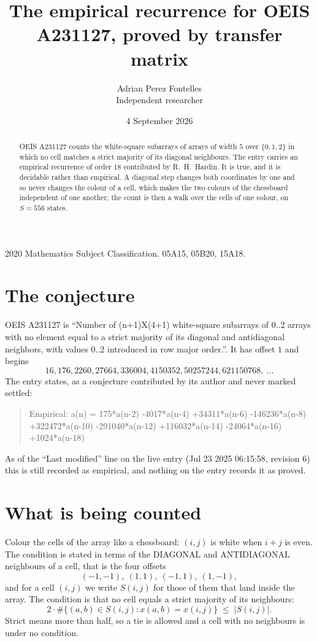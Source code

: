 \documentclass[11pt,a4paper]{article}
\title{The empirical recurrence for OEIS A231127, proved by transfer matrix}
\author{Adrian Perez Fontelles\\ \small Independent researcher}
\date{4 September 2026}
\theoremstyle{plain}
\theoremstyle{definition}
\begin{document}
\maketitle

\begin{abstract}
OEIS A231127 counts the white-square subarrays of arrays of width $5$ over $\{0,1,2\}$ in which
no cell matches a strict majority of its diagonal neighbours. The entry carries an empirical recurrence of order $18$ contributed by
R.~H.~Hardin. It is true, and it is decidable rather than empirical. A diagonal step changes
both coordinates by one and so never changes the colour of a cell, which makes the two colours
of the chessboard independent of one another; the count is then a walk over the cells of one
colour, on $S=556$ states.
\end{abstract}

\noindent\small 2020 Mathematics Subject Classification. 05A15, 05B20, 15A18.\normalsize

\section{The conjecture}

OEIS A231127 is ``Number of (n+1)X(4+1) white-square subarrays of 0..2 arrays with no element equal to a strict majority of its diagonal and antidiagonal neighbors, with values 0..2 introduced in row major order.''. It has offset $1$ and begins
\[
16, 176, 2260, 27664, 336004, 4150352, 50257244, 621150768,\ \dots
\]
The entry states, as a conjecture contributed by its author and never marked settled:
\begin{quote}
Empirical: a(n) = 175*a(n-2) -4017*a(n-4) +34311*a(n-6) -146236*a(n-8) +322472*a(n-10) -291040*a(n-12) +116032*a(n-14) -24064*a(n-16) +1024*a(n-18)
\end{quote}
As of the ``Last modified'' line on the live entry (Jul 23 2025 06:15:58, revision 6) this is still
recorded as empirical, and nothing on the entry records it as proved.

\section{What is being counted}

Colour the cells of the array like a chessboard: $(i,j)$ is white when $i+j$ is even. The
condition is stated in terms of the DIAGONAL and ANTIDIAGONAL neighbours of a cell, that is the
four offsets
\[
(-1,-1),\ (1,1),\ (-1,1),\ (1,-1),
\]
and for a cell $(i,j)$ we write $S(i,j)$ for those of them that land inside the array. The
condition is that no cell equals a strict majority of its neighbours:
\[
2\cdot\#\{(a,b)\in S(i,j) : x(a,b)=x(i,j)\}\;\le\;|S(i,j)| .
\]
Strict means more than half, so a tie is allowed and a cell with no neighbours is under no condition.
\end{document}
